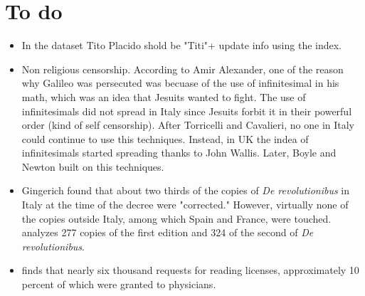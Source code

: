
\section{To do}
\begin{itemize}
	\item In the dataset Tito Placido shold be "Titi"+ update info using the index.
	\item Non religious censorship. According to Amir Alexander, one of the reason why Galileo was persecuted was becuase of the use of infinitesimal in his math, which was an idea that Jesuits wanted to fight. The use of infinitesimals did not spread in Italy since Jesuits forbit it in their powerful order (kind of self censorship). After Torricelli and Cavalieri, no one in Italy could continue to use this techniques. Instead, in UK the indea of infinitesimals started spreading thanks to John Wallis. Later, Boyle and Newton built on this techniques.	
	\item Gingerich found that about two thirds of the copies of \textit{De revolutionibus} in Italy at the time of the decree were "corrected." However, virtually none of the copies outside Italy, among which Spain and France, were touched.  analyzes 277 copies of the first edition and 324 of the second of \textit{De revolutionibus}.
	
	\item {} finds that nearly six thousand requests for reading licenses, approximately 10 percent of which were granted to physicians.
	
\end{itemize}	
